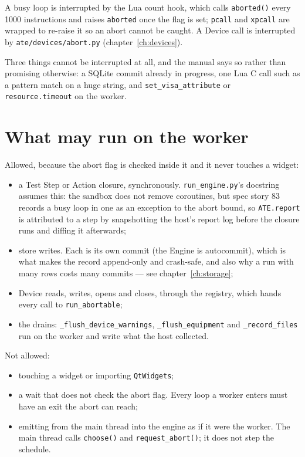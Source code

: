 A busy loop is interrupted by the Lua count hook, which calls \texttt{aborted()} every 1000
instructions and raises \texttt{aborted} once the flag is set; \texttt{pcall} and \texttt{xpcall} are
wrapped to re-raise it so an abort cannot be caught. A Device call is interrupted by
\texttt{ate/devices/abort.py} (chapter~\ref{ch:devices}).

Three things cannot be interrupted at all, and the manual says so rather than promising otherwise: a
SQLite commit already in progress, one Lua C call such as a pattern match on a huge string, and
\texttt{set\_visa\_attribute} or \texttt{resource.timeout} on the worker.

\section{What may run on the worker}

Allowed, because the abort flag is checked inside it and it never touches a widget:

\begin{itemize}
  \item a Test Step or Action closure, synchronously. \texttt{run\_engine.py}'s docstring assumes
    this: the sandbox does not remove coroutines, but spec story 83 records a busy loop in one as an
    exception to the abort bound, so \texttt{ATE.report} is attributed to a step by snapshotting the
    host's report log before the closure runs and diffing it afterwards;
  \item store writes. Each is its own commit (the Engine is autocommit), which is what makes the record
    append-only and crash-safe, and also why a run with many rows costs many commits --- see
    chapter~\ref{ch:storage};
  \item Device reads, writes, opens and closes, through the registry, which hands every call to
    \texttt{run\_abortable};
  \item the drains: \texttt{\_\allowbreak{}flush\_\allowbreak{}device\_\allowbreak{}warnings}, \texttt{\_flush\_equipment} and
    \texttt{\_record\_files} run on the worker and write what the host collected.
\end{itemize}

Not allowed:

\begin{itemize}
  \item touching a widget or importing \texttt{QtWidgets};
  \item a wait that does not check the abort flag. Every loop a worker enters must have an exit the
    abort can reach;
  \item emitting from the main thread into the engine as if it were the worker. The main thread calls
    \texttt{choose()} and \texttt{request\_abort()}; it does not step the schedule.
\end{itemize}

